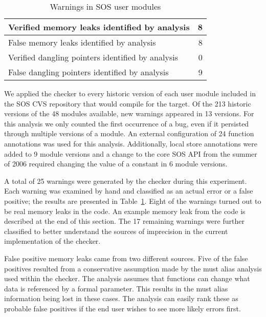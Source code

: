 \begin{table}
\caption{Warnings in SOS user modules}
%
\label{tab:module}
\centering 
\begin{tabular}{| l | r |}
    \hline 
    Verified memory leaks identified by analysis & 8 \\
    \hline
    False memory leaks identified by analysis & 8 \\
    \hline 
    Verified dangling pointers identified by analysis & 0 \\
    \hline 
    False dangling pointers identified by analysis & 9 \\
    \hline 
\end{tabular} 
%
\end{table}

We applied the checker to every historic version of each user module
included in the SOS CVS repository that would compile for the
 target.  
%
Of the 213 historic versions of the 48 modules available, new warnings
appeared in 13 versions.  For this analysis we only counted the first
occurrence of a bug, even if it persisted through multiple versions of
a module.
%
An external configuration of 24 function annotations was used for this
analysis.  Additionally, local store annotations were added to 9
module versions and a change to the core SOS API from the summer of
2006 required changing the value of a constant in 6 module versions.


A total of 25 warnings were generated by the checker during this
experiment.  Each warning was examined by hand and classified as an
actual error or a false positive; the results are presented in
Table~\ref{tab:module}.  Eight of the warnings turned out to be real
memory leaks in the code.  An example memory leak from the code is
described at the end of this section.
%
The 17 remaining warnings were further classified to better
understand the sources of imprecision in the current implementation of
the checker.  


\smallskip{}

False positive memory leaks came from two different sources. Five of
the false positives resulted from a conservative assumption made by
the must alias analysis used within the checker.  The analysis assumes
that functions can change what data is referenced by a formal
parameter.  This results in the must alias information being lost in
these cases.  The analysis can easily rank these as probable false
positives if the end user wishes to see more likely errors first.


